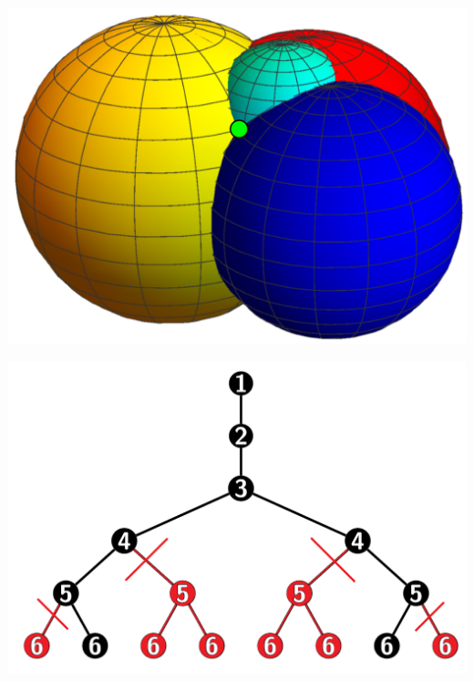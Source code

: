 \documentclass[10pt]{beamer}
\theoremstyle{plain}
\theoremstyle{definition}
\begin{document}
\begin{frame}
{			\begin{center}
				\begin{minipage}{0.8\linewidth}
					\hspace{0.05cm}
				\end{minipage}	
				\begin{minipage}{0.3\linewidth}
					\includegraphics[width=0.95\linewidth]{quatroesferas.png}
				\end{minipage}
				\begin{minipage}{0.2\linewidth}
					\includegraphics[width=1.5\linewidth]{prune.png}
				\end{minipage}
				\begin{minipage}{0.08\linewidth}
					\hspace{0.2cm}
				\end{minipage}
			\end{center}
		}	
	\end{frame}
\end{document}
